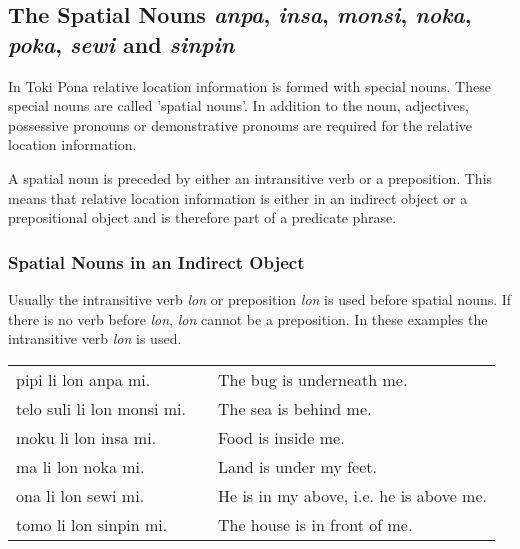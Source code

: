 \subsection*{The Spatial Nouns \textit{anpa}, \textit{insa}, \textit{monsi}, \textit{noka}, \textit{poka}, \textit{sewi} and \textit{sinpin}}
%
%

In Toki Pona relative location information is formed with special nouns.
These special nouns are called 'spatial nouns'.
In addition to the noun, adjectives, possessive pronouns or demonstrative pronouns are required for the relative location information.

A spatial noun is preceded by either an intransitive verb or a preposition.
This means that relative location information is either in an indirect object or a prepositional object and is therefore part of a predicate phrase.

%
\subsubsection*{Spatial Nouns in an Indirect Object}
%
%
%

Usually the intransitive verb \textit{lon} or preposition \textit{lon} is used before spatial nouns.
If there is no verb before \textit{lon}, \textit{lon} cannot be a preposition.
In these examples the intransitive verb \textit{lon} is used.

\begin{supertabular}{p{5,5cm}|ll}
    pipi li lon anpa mi.       &  & The bug is underneath me.               \\
    telo suli li lon monsi mi. &  & The sea is behind me.                   \\
    moku li lon insa mi.       &  & Food is inside me.                      \\
    ma li lon noka mi.         &  & Land is under my feet.                  \\
    ona li lon sewi mi.        &  & He is in my above, i.e. he is above me. \\
    tomo li lon sinpin mi.     &  & The house is in front of me.            \\
\end{supertabular}

